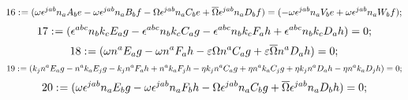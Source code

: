 \documentclass[11pt]{article}
\def\specialcolon{\mathrel{\mathop{:}}\hspace{-.5em}}
\renewcommand{\bar}[1]{\overline{#1}}
\begin{document}
\begin{dmath*}[compact, spread=2pt]
16\specialcolon{}= (\omega {\epsilon}^{j a b} {n}_{a} {A}_{b} e - \omega {\epsilon}^{j a b} {n}_{a} {B}_{b} f - \Omega {\epsilon}^{j a b} {n}_{a} {C}_{b} e + \bar \Omega {\epsilon}^{j a b} {n}_{a} {D}_{b} f) = ( - \omega {\epsilon}^{j a b} {n}_{a} {V}_{b} e + \omega {\epsilon}^{j a b} {n}_{a} {W}_{b} f);
\end{dmath*}
\begin{dmath*}[compact, spread=2pt]
17\specialcolon{}= ({\epsilon}^{a b c} {n}_{b} {k}_{c} {E}_{a} g - {\epsilon}^{a b c} {n}_{b} {k}_{c} {C}_{a} g - {\epsilon}^{a b c} {n}_{b} {k}_{c} {F}_{a} h + {\epsilon}^{a b c} {n}_{b} {k}_{c} {D}_{a} h) = 0;
\end{dmath*}
\begin{dmath*}[compact, spread=2pt]
18\specialcolon{}= (\omega {n}^{a} {E}_{a} g - \omega {n}^{a} {F}_{a} h - \varepsilon \Omega {n}^{a} {C}_{a} g + \varepsilon \bar \Omega {n}^{a} {D}_{a} h) = 0;
\end{dmath*}
\begin{dmath*}[compact, spread=2pt]
19\specialcolon{}= ({k}_{j} {n}^{a} {E}_{a} g - {n}^{a} {k}_{a} {E}_{j} g - {k}_{j} {n}^{a} {F}_{a} h + {n}^{a} {k}_{a} {F}_{j} h - \eta {k}_{j} {n}^{a} {C}_{a} g + \eta {n}^{a} {k}_{a} {C}_{j} g + \eta {k}_{j} {n}^{a} {D}_{a} h - \eta {n}^{a} {k}_{a} {D}_{j} h) = 0;
\end{dmath*}
\begin{dmath*}[compact, spread=2pt]
20\specialcolon{}= (\omega {\epsilon}^{j a b} {n}_{a} {E}_{b} g - \omega {\epsilon}^{j a b} {n}_{a} {F}_{b} h - \Omega {\epsilon}^{j a b} {n}_{a} {C}_{b} g + \bar \Omega {\epsilon}^{j a b} {n}_{a} {D}_{b} h) = 0;
\end{dmath*}
\end{document}
